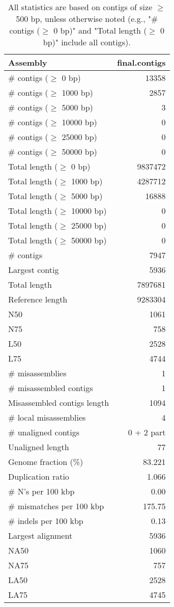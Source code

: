 \documentclass[12pt,a4paper]{article}
\begin{document}
\begin{table}[ht]
\begin{center}
\caption{All statistics are based on contigs of size $\geq$ 500 bp, unless otherwise noted (e.g., "\# contigs ($\geq$ 0 bp)" and "Total length ($\geq$ 0 bp)" include all contigs).}
\begin{tabular}{|l*{1}{|r}|}
\hline
Assembly & final.contigs \\ \hline
\# contigs ($\geq$ 0 bp) & 13358 \\ \hline
\# contigs ($\geq$ 1000 bp) & 2857 \\ \hline
\# contigs ($\geq$ 5000 bp) & 3 \\ \hline
\# contigs ($\geq$ 10000 bp) & 0 \\ \hline
\# contigs ($\geq$ 25000 bp) & 0 \\ \hline
\# contigs ($\geq$ 50000 bp) & 0 \\ \hline
Total length ($\geq$ 0 bp) & 9837472 \\ \hline
Total length ($\geq$ 1000 bp) & 4287712 \\ \hline
Total length ($\geq$ 5000 bp) & 16888 \\ \hline
Total length ($\geq$ 10000 bp) & 0 \\ \hline
Total length ($\geq$ 25000 bp) & 0 \\ \hline
Total length ($\geq$ 50000 bp) & 0 \\ \hline
\# contigs & 7947 \\ \hline
Largest contig & 5936 \\ \hline
Total length & 7897681 \\ \hline
Reference length & 9283304 \\ \hline
N50 & 1061 \\ \hline
N75 & 758 \\ \hline
L50 & 2528 \\ \hline
L75 & 4744 \\ \hline
\# misassemblies & 1 \\ \hline
\# misassembled contigs & 1 \\ \hline
Misassembled contigs length & 1094 \\ \hline
\# local misassemblies & 4 \\ \hline
\# unaligned contigs & 0 + 2 part \\ \hline
Unaligned length & 77 \\ \hline
Genome fraction (\%) & 83.221 \\ \hline
Duplication ratio & 1.066 \\ \hline
\# N's per 100 kbp & 0.00 \\ \hline
\# mismatches per 100 kbp & 175.75 \\ \hline
\# indels per 100 kbp & 0.13 \\ \hline
Largest alignment & 5936 \\ \hline
NA50 & 1060 \\ \hline
NA75 & 757 \\ \hline
LA50 & 2528 \\ \hline
LA75 & 4745 \\ \hline
\end{tabular}
\end{center}
\end{table}
\end{document}

